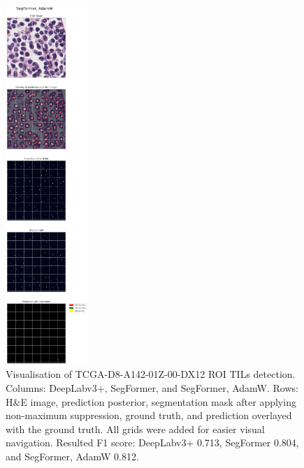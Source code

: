 \begin{figure}[H]
    \includegraphics[width=0.276\textwidth, valign=b]{figures/tils/TCGA-D8-A142-01Z-00-DX12_F1_segformer,_adamw_adj.png}
    \caption{Visualisation of TCGA-D8-A142-01Z-00-DX12 ROI TILs detection.
    Columns: DeepLabv3+, SegFormer, and SegFormer, AdamW.
    Rows: H\&E image, prediction posterior, segmentation mask after applying non-maximum suppression, ground truth, and prediction overlayed with the ground truth. All grids were added for easier visual navigation.
    Resulted F1 score: DeepLabv3+ 0.713, SegFormer 0.804, and SegFormer, AdamW 0.812.}
    \label{fig:TCGA-D8-A142_tils}
\end{figure}

